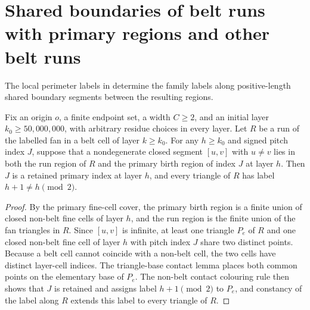 \section{Shared boundaries of belt runs with primary regions and other belt runs}
\label{sec:area_law_belt_run_interfaces}

The local perimeter labels in \cite[Section~11]{OpenAI2026AreaLaw}
determine the family labels along positive-length shared boundary segments
between the resulting regions.


\begin{lemma}
    \label{thm:area_law_belt_run_primary_interface}
    \leanok
    Fix an origin $o$, a finite endpoint set, a width $C\ge 2$, and an
    initial layer $k_0\ge 50{,}000{,}000$, with arbitrary residue choices
    in every layer. Let $R$ be a run of the labelled fan in a belt cell of
    layer $k\ge k_0$. For any $h\ge k_0$ and signed pitch index $J$, suppose
    that a nondegenerate closed segment $[u,v]$ with $u\ne v$ lies in both
    the run region of $R$ and the primary birth region of index $J$ at
    layer $h$. Then $J$ is a retained primary index at layer $h$, and every
    triangle of $R$ has label $h+1\ne h\pmod2$.
\end{lemma}
\begin{proof}\leanok
    By the primary fine-cell cover, the primary birth region is a finite
    union of closed non-belt fine cells of layer $h$, and the run region
    is the finite union of the fan triangles in $R$. Since $[u,v]$ is
    infinite, at least one triangle $P_e$ of $R$ and one closed non-belt
    fine cell of layer $h$ with pitch index $J$ share two distinct points.
    Because a belt cell cannot coincide with a non-belt cell, the two cells
    have distinct layer-cell indices. The triangle-base contact lemma places
    both common points on the elementary base of $P_e$. The non-belt contact
    colouring rule then shows that $J$ is retained and assigns label $h+1\pmod2$
    to $P_e$, and constancy of the label along $R$ extends this label to every
    triangle of $R$.
\end{proof}

